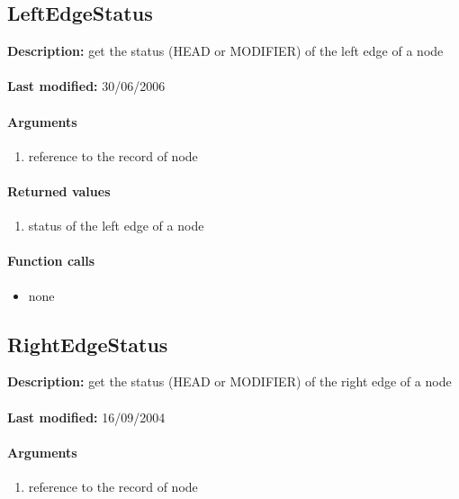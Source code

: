 \subsection{LeftEdgeStatus}
\textbf{Description:} get the status (HEAD or MODIFIER) of the left edge of a node\\
\\\textbf{Last modified:} 30/06/2006

\paragraph{Arguments}
\begin{enumerate}
\item reference to the record of node
\end{enumerate}

\paragraph{Returned values}
\begin{enumerate}
\item status of the left edge of a node
\end{enumerate}

\paragraph{Function calls}
\begin{itemize}
\item none
\end{itemize}

\subsection{RightEdgeStatus}
\textbf{Description:} get the status (HEAD or MODIFIER) of the right edge of a node\\
\\\textbf{Last modified:} 16/09/2004

\paragraph{Arguments}
\begin{enumerate}
\item reference to the record of node
\end{enumerate}

